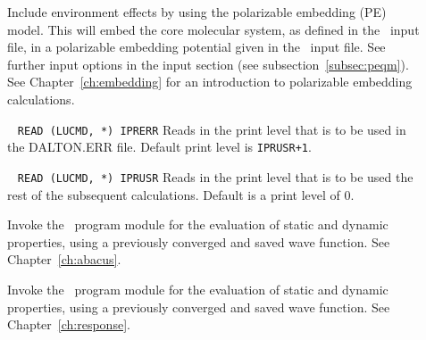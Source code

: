 \begin{description}


\item[]  Include environment effects by using the polarizable embedding (PE) model. This will embed the core molecular system, as defined in the \mol\ input file, in a polarizable embedding potential given in the \pot\ input file. See further input options in the  input section (see subsection~\ref{subsec:peqm}). See Chapter~\ref{ch:embedding} for an introduction to polarizable embedding calculations.

\item[]\verb| |\newline
\verb|READ (LUCMD, *) IPRERR|
 
Reads in the print level that is to be used in the DALTON.ERR
file. Default print level is \verb|IPRUSR+1|.

\item[]\verb| |\newline
\verb|READ (LUCMD, *) IPRUSR|
Reads in the print level that is to be used the rest of the subsequent
calculations. Default is a print level of 0.

\item[] Invoke the \aba\ program module for the evaluation of static
and dynamic properties, using a previously converged and saved wave function. See Chapter~\ref{ch:abacus}.

\item[]

Invoke the \resp\ program module for the evaluation of static and dynamic
properties, using a previously converged and saved wave function. See Chapter~\ref{ch:response}.


\end{description}
